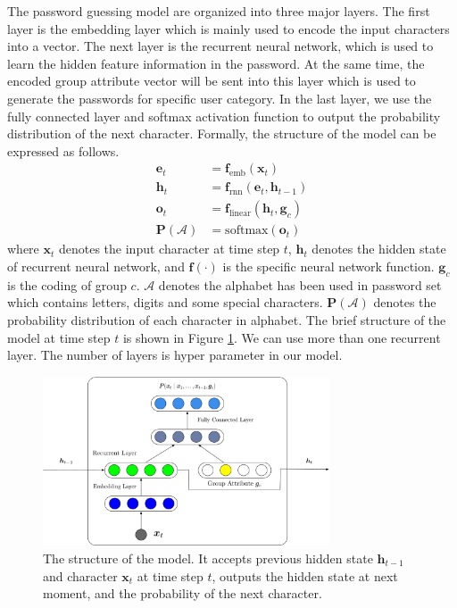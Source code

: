 \documentclass[10pt, twocolumnjournal]{IEEEtran}
\begin{document}
The password guessing model are organized into three major layers. The first layer is the embedding layer which is mainly used to encode the input characters into a vector. The next layer is the recurrent neural network, which is used to learn the hidden feature information in the password. At the same time, the encoded group attribute vector will be sent into this layer which is used to generate the passwords for specific user category. In the last layer, we use the fully connected layer and softmax activation function to output the probability distribution of the next character. Formally, the structure of the model can be expressed as follows.
\begin{align*}
	\bm e_t &= \bm f_{\mathrm{emb}}(\bm x_t) \\
	\bm h_t &= \bm f_{\mathrm{rnn}}(\bm e_t, \bm h_{t-1}) \\
	\bm o_t &= \bm f_{\mathrm{linear}}(\bm h_t, \bm g_c) \\
	\bm P(\mathcal A) &= \mathrm{softmax}(\bm o_t)
\end{align*}
where $\bm x_t$ denotes the input character at time step $t$, $\bm h_t$ denotes the hidden state of recurrent neural network, and $\bm f(\cdot)$ is the specific neural network function. $\bm g_c$ is the coding of group $c$. $\mathcal A$ denotes the alphabet has been used in password set which contains letters, digits and some special characters. $\bm P(\mathcal A)$ denotes the probability distribution of each character in alphabet. The brief structure of the model at time step $t$ is shown in Figure \ref{fig:sys_model}. We can use more than one recurrent layer. The number of layers is hyper parameter in our model. 
\begin{figure}
	\centering
	\includegraphics[width=8.5cm]{Model.pdf}
	\caption{ The structure of the model. It accepts previous hidden state $\bm h_{t-1}$ and character $\bm x_t$ at time step $t$, outputs the hidden state at next moment, and the probability of the next character.}
	\label{fig:sys_model}
\end{figure}
\end{document}

